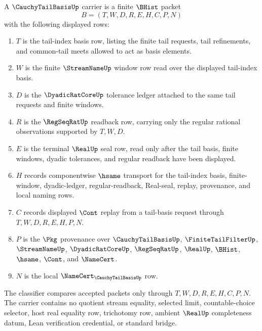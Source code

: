 \begin{definition}
\label{def:cauchy-tail-basis-carrier}
A $\CauchyTailBasisUp$ carrier is a finite $\BHist$ packet
$$
B=(T,W,D,R,E,H,C,P,N)
$$
with the following displayed rows:
\begin{enumerate}
\item $T$ is the tail-index basis row, listing the finite tail requests, tail refinements, and common-tail meets allowed to act as basis elements.
\item $W$ is the finite $\StreamNameUp$ window row read over the displayed tail-index basis.
\item $D$ is the $\DyadicRatCoreUp$ tolerance ledger attached to the same tail requests and finite windows.
\item $R$ is the $\RegSeqRatUp$ readback row, carrying only the regular rational observations supported by $T,W,D$.
\item $E$ is the terminal $\RealUp$ seal row, read only after the tail basis, finite windows, dyadic tolerances, and regular readback have been displayed.
\item $H$ records componentwise $\hsame$ transport for the tail-index basis, finite-window, dyadic-ledger, regular-readback, Real-seal, replay, provenance, and local naming rows.
\item $C$ records displayed $\Cont$ replay from a tail-basis request through $T,W,D,R,E,H,P,N$.
\item $P$ is the $\Pkg$ provenance over $\CauchyTailBasisUp$, $\FiniteTailFilterUp$, $\StreamNameUp$, $\DyadicRatCoreUp$, $\RegSeqRatUp$, $\RealUp$, $\BHist$, $\hsame$, $\Cont$, and $\NameCert$.
\item $N$ is the local $\NameCert_{\CauchyTailBasisUp}$ row.
\end{enumerate}
The classifier compares accepted packets only through $T,W,D,R,E,H,C,P,N$. The carrier contains no quotient stream equality, selected limit, countable-choice selector, host real equality row, trichotomy row, ambient $\RealUp$ completeness datum, Lean verification credential, or standard bridge.
\end{definition}

